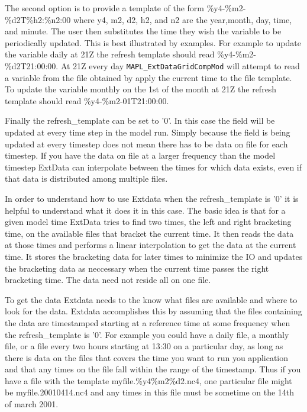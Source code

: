 The second option is to provide a template of the form \%y4-\%m2-\%d2T\%h2:\%n2:00 where
y4, m2, d2, h2, and n2 are the year,month, day, time, and minute. The user then
substitutes the time they wish the variable to be periodically updated. This is best illustrated by examples.
For example to update the variable daily at 21Z the refresh template should read
\%y4-\%m2-\%d2T21:00:00. At 21Z every day {\tt MAPL\_ExtDataGridCompMod} will attempt to read a
variable from the file obtained by apply the current time to the file template.
To update the variable monthly on the 1st of the month at 21Z the refresh
template should read \%y4-\%m2-01T21:00:00.

Finally the refresh\_template can be set to '0'. In this case the field will be updated
at every time step in the model run. Simply because the field is being updated at every timestep does not mean
there has to be data on file for each timestep. If you have the data on file at a larger frequency than the model
timestep ExtData can interpolate between the times for which data exists, even if that data is distributed among multiple files.

In order to understand how to use Extdata when the refresh\_template is '0' it is helpful to understand what it does it in this case.
The basic idea is that for a given model time ExtData tries to find two times, the
left and right bracketing time, on the available files that bracket the current time.
It then reads the data at those times and performs a linear interpolation to get the data at the current time.
It stores the bracketing data for later times to minimize the IO and updates the bracketing data as neccessary when the current time passes the
right bracketing time.
The data need not reside all on one file.

To get the data Extdata needs to the know what files are available and where to look for the data.
Extdata accomplishes this by assuming
that the files containing the data are timestamped starting at a reference time at some frequency when the
refresh\_template is '0'.
For example you could have a daily file, a monthly file, or a file every two hours starting at 13:30 on a particular day,
as long as there is data on the files that covers the time you want to run you application and that any times on the file
fall within the range of the timestamp. Thus if you have a file with the template myfile.\%y4\%m2\%d2.nc4, one particular
file might be myfile.20010414.nc4 and any times in this file must be sometime on the 14th of march 2001.

